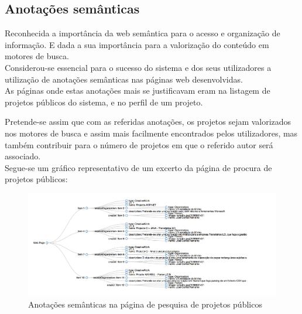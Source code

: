 \subsection{Anotações semânticas}

Reconhecida a importância da web semântica para o acesso e organização de informação. E dada a sua importância para a valorização do conteúdo em motores de busca.\\

Considerou-se essencial para o sucesso do sistema e dos seus utilizadores a utilização de anotações semânticas nas páginas web desenvolvidas.\\

As páginas onde estas anotações mais se justificavam eram na listagem de projetos públicos do sistema, e no perfil de um projeto.

Pretende-se assim que com as referidas anotações, os projetos sejam valorizados nos motores de busca e assim mais facilmente encontrados pelos utilizadores, mas também contribuir para o número de projetos em que o referido autor será associado.\\

Segue-se um gráfico representativo de um excerto da página de procura de projetos públicos:

\begin{figure}[H]
  \centering
  \includegraphics[width=1\textwidth,center]{images/implementacao/rdfa}
  \caption{Anotações semânticas na página de pesquisa de projetos públicos}
\end{figure}

